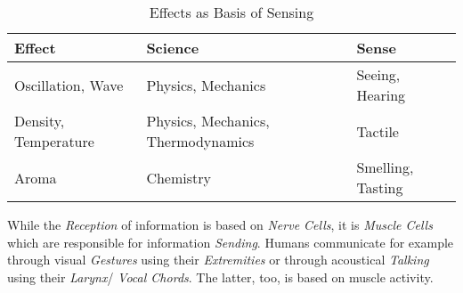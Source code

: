 \begin{table}[ht]
    \begin{center}
        \begin{footnotesize}
        \begin{tabular}{| p{30mm} | p{50mm} | p{25mm} |}
            \hline
            \textbf{Effect} & \textbf{Science} & \textbf{Sense}\\
            \hline
            Oscillation, Wave & Physics, Mechanics & Seeing, Hearing\\
            \hline
            Density, Temperature & Physics, Mechanics, Thermodynamics & Tactile\\
            \hline
            Aroma & Chemistry & Smelling, Tasting\\
            \hline
        \end{tabular}
        \end{footnotesize}
        \caption{Effects as Basis of Sensing}
        \label{effects_table}
    \end{center}
\end{table}

While the \emph{Reception} of information is based on \emph{Nerve Cells}, it is
\emph{Muscle Cells} which are responsible for information \emph{Sending}.
Humans communicate for example through visual \emph{Gestures} using their
\emph{Extremities} or through acoustical \emph{Talking} using their
\emph{Larynx}/ \emph{Vocal Chords}. The latter, too, is based on muscle
activity.
